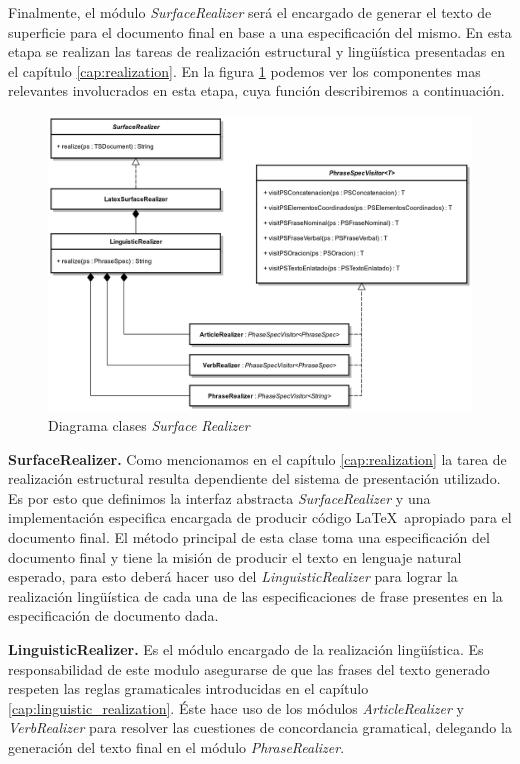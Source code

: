 Finalmente, el módulo \emph{SurfaceRealizer} será el encargado de generar el texto de superficie para el documento final en base a una especificación del mismo. En esta etapa se realizan las tareas de realización estructural y lingüística presentadas en el capítulo \ref{cap:realization}. En la figura \ref{fig:imp_surfrealizer} podemos ver los componentes mas relevantes involucrados en esta etapa, cuya función describiremos a continuación. 

\begin{figure}[H]
  	\centering
	\includegraphics[scale=0.17]{img/realizer_imp.png}
	\caption{Diagrama clases \textit{Surface Realizer}}
  	\label{fig:imp_surfrealizer}
\end{figure}

\bigskip
\noindent
\textbf{SurfaceRealizer.} Como mencionamos en el capítulo \ref{cap:realization} la tarea de realización estructural resulta dependiente del sistema de presentación utilizado. Es por esto que definimos la interfaz abstracta \textit{SurfaceRealizer} y una implementación especifica encargada de producir código \LaTeX~apropiado para el documento final. El método principal de esta clase toma una especificación del documento final y tiene la misión de producir el texto en lenguaje natural esperado, para esto deberá hacer uso del \textit{LinguisticRealizer} para lograr la realización lingüística de cada una de las especificaciones de frase presentes en la especificación de documento dada. 


\bigskip
\noindent
\textbf{LinguisticRealizer.} Es el módulo encargado de la realización lingüística. Es responsabilidad de este modulo asegurarse de que las frases del texto generado respeten las reglas gramaticales introducidas en el capítulo \ref{cap:linguistic_realization}. Éste hace uso de los módulos \textit{ArticleRealizer} y \textit{VerbRealizer} para resolver las cuestiones de concordancia gramatical, delegando la generación del texto final en el módulo \textit{PhraseRealizer}. 

